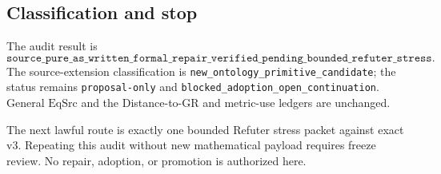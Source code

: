 \subsection{Classification and stop}

The audit result is
\[
 \texttt{source\_pure\_as\_written\_formal\_repair\_verified\_pending\_bounded\_refuter\_stress}.
\]
The source-extension classification is
\texttt{new\_ontology\_primitive\_candidate}; the status remains
\texttt{proposal-only} and
\texttt{blocked\_adoption\_open\_continuation}. General \(\mathrm{EqSrc}\)
and the Distance-to-GR and metric-use ledgers are unchanged.

The next lawful route is exactly one bounded Refuter stress packet against
exact v3. Repeating this audit without new mathematical payload requires
freeze review. No repair, adoption, or promotion is authorized here.

